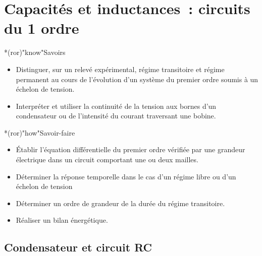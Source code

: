 \documentclass[../../main/main.tex]{subfiles}
\begin{document}
\setcounter{chapter}{2}

\chapter{Capacit\'es et inductances~: circuits du 1\ier{} ordre}

\vfill

\begin{prgm}
	\begin{tcb}*(ror)"know"{Savoirs}
		\begin{itemize}[label=$\diamond$, leftmargin=10pt]
			\item Distinguer, sur un relevé expérimental, régime transitoire et
			      régime permanent au cours de l'évolution d'un système du premier
			      ordre soumis à un échelon de tension.
			\item Interpréter et utiliser la continuité de la tension aux bornes d'un
			      condensateur ou de l'intensité du courant traversant une bobine.
		\end{itemize}
	\end{tcb}

	\begin{tcb}*(ror)"how"{Savoir-faire}
		\begin{itemize}[label=$\diamond$, leftmargin=10pt]
			\item Établir l'équation différentielle du premier ordre vérifiée par une
			      grandeur électrique dans un circuit comportant une ou deux mailles.
			\item Déterminer la réponse temporelle dans le cas d'un régime libre ou
			      d'un échelon de tension
			\item Déterminer un ordre de grandeur de la durée du régime transitoire.
			\item Réaliser un bilan énergétique.
		\end{itemize}
	\end{tcb}
\end{prgm}

\vfill
\minitoc
\vfill

\newpage

\section{Condensateur et circuit RC}
\end{document}
